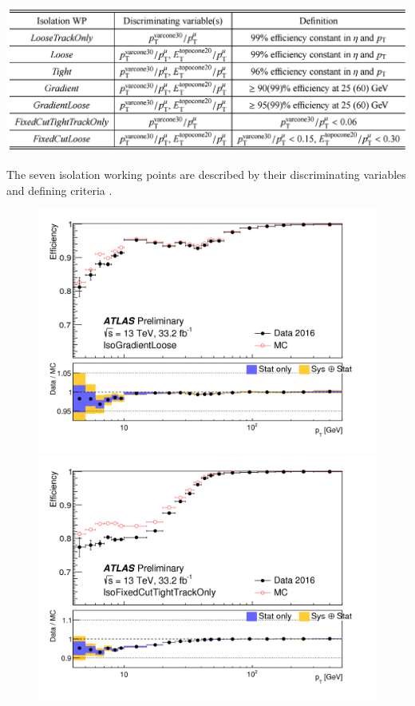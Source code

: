 \begin{table}[!h]
	\centering 
    \includegraphics[width=.9\textwidth]{Pictures/isolationworkingpoints.PNG}
    \caption{The seven isolation working points are described by their discriminating variables and defining criteria \cite{MCPpaper}.}
    \label{tab:datasetsdef}
\end{table}

\begin{figure}[!h]
  \centering
  \begin{minipage}[b]{0.47\textwidth}
    \includegraphics[width=\textwidth]{Pictures/isolationefficiency1.png}
  \end{minipage}
  \hspace{.2cm}
  \begin{minipage}[b]{0.48\textwidth}
    \includegraphics[width=\textwidth]{Pictures/isolationefficiency2.png}

\end{minipage}
\end{figure}
